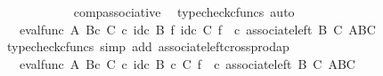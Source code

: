 \begin{isabellebody}
\ \ \ \ \ \ \ \ \ \ \isamarkupfalse%
\ comp{\isacharunderscore}{\kern0pt}associative{}\ \isamarkupfalse%
\ {\isacharparenleft}{\kern0pt}typecheck{\isacharunderscore}{\kern0pt}cfuncs{\isacharcomma}{\kern0pt}\ auto{\isacharparenright}{\kern0pt}\isanewline
\ \ \ \ \ \ \ \ \isamarkupfalse%
\ \isamarkupfalse%
\ {\isachardoublequoteopen}{\isachardot}{\kern0pt}{\isachardot}{\kern0pt}{\isachardot}{\kern0pt}\ {\isacharequal}{\kern0pt}\ {\isacharparenleft}{\kern0pt}eval{\isacharunderscore}{\kern0pt}func\ A\ {\isacharparenleft}{\kern0pt}B{\isasymtimes}\isactrlsub c\ C{\isacharparenright}{\kern0pt}{\isacharparenright}{\kern0pt}\ {\isasymcirc}\isactrlsub c\ {\isacharparenleft}{\kern0pt}{\isacharparenleft}{\kern0pt}id\isactrlsub c\ B\ {\isasymtimes}\isactrlsub f\ id\isactrlsub c\ C{\isacharparenright}{\kern0pt}\ {\isasymtimes}\isactrlsub f\ {\isasympsi}\isactrlsup {\isasymsharp}{\isacharparenright}{\kern0pt}\ {\isasymcirc}\isactrlsub c\ associate{\isacharunderscore}{\kern0pt}left\ B\ C\ {\isacharparenleft}{\kern0pt}{\isacharparenleft}{\kern0pt}A\isactrlbsup B\isactrlesup {\isacharparenright}{\kern0pt}\isactrlbsup C\isactrlesup {\isacharparenright}{\kern0pt}{\isachardoublequoteclose}\isanewline
\ \ \ \ \ \ \ \ \ \ \isamarkupfalse%
\ {\isacharparenleft}{\kern0pt}typecheck{\isacharunderscore}{\kern0pt}cfuncs{\isacharcomma}{\kern0pt}\ simp\ add{\isacharcolon}{\kern0pt}\ associate{\isacharunderscore}{\kern0pt}left{\isacharunderscore}{\kern0pt}crossprod{\isacharunderscore}{\kern0pt}ap{\isacharparenright}{\kern0pt}\isanewline
\ \ \ \ \ \ \ \ \isamarkupfalse%
\ \isamarkupfalse%
\ {\isachardoublequoteopen}{\isachardot}{\kern0pt}{\isachardot}{\kern0pt}{\isachardot}{\kern0pt}\ {\isacharequal}{\kern0pt}\ {\isacharparenleft}{\kern0pt}eval{\isacharunderscore}{\kern0pt}func\ A\ {\isacharparenleft}{\kern0pt}B{\isasymtimes}\isactrlsub c\ C{\isacharparenright}{\kern0pt}{\isacharparenright}{\kern0pt}\ {\isasymcirc}\isactrlsub c\ {\isacharparenleft}{\kern0pt}{\isacharparenleft}{\kern0pt}id\isactrlsub c\ {\isacharparenleft}{\kern0pt}B\ {\isasymtimes}\isactrlsub c\ C{\isacharparenright}{\kern0pt}{\isacharparenright}{\kern0pt}\ {\isasymtimes}\isactrlsub f\ {\isasympsi}\isactrlsup {\isasymsharp}{\isacharparenright}{\kern0pt}\ {\isasymcirc}\isactrlsub c\ associate{\isacharunderscore}{\kern0pt}left\ B\ C\ {\isacharparenleft}{\kern0pt}{\isacharparenleft}{\kern0pt}A\isactrlbsup B\isactrlesup {\isacharparenright}{\kern0pt}\isactrlbsup C\isactrlesup {\isacharparenright}{\kern0pt}{\isachardoublequoteclose}\isanewline

\end{isabellebody}
